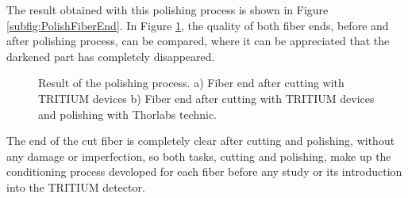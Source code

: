 The result obtained with this polishing process is shown in Figure \ref{subfig:PolishFiberEnd}. In Figure \ref{fig:ResultofPolishingProcess}, the quality of both fiber ends, before and after polishing process, can be compared, where it can be appreciated that the darkened part has completely disappeared. 

\begin{figure}[htbp]
 \centering
 \caption{Result of the polishing process. a) Fiber end after cutting with TRITIUM devices b) Fiber end after cutting with TRITIUM devices and polishing with Thorlabs technic.}
 \label{fig:ResultofPolishingProcess}
\end{figure}

The end of the cut fiber is completely clear after cutting and polishing, without any damage or imperfection, so both tasks, cutting and polishing,  make up the conditioning process developed for each fiber before any study or its introduction into the TRITIUM detector.